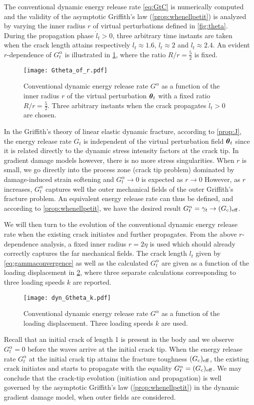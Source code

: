 The conventional dynamic energy release rate \eqref{eq:GtC} is numerically computed and the validity of the asymptotic Griffith's law (\cref{prop:whenellpetit}) is analyzed by varying the inner radius $r$ of virtual perturbations defined in \cref{fig:theta}. During the propagation phase $\dot{l}_t>0$, three arbitrary time instants are taken when the crack length attains respectively $l_t\approx 1.6$, $l_t\approx 2$ and $l_t\approx 2.4$. An evident $r$-dependence of $G^\alpha_t$ is illustrated in \cref{fig:indvelocity}, where the ratio $R/r=\frac{5}{2}$ is fixed.
\begin{figure}[htbp]
\centering
\texttt{[image: Gtheta\_of\_r.pdf]}
\caption{Conventional dynamic energy release rate $G^\alpha$ as a function of the inner radius $r$ of the virtual perturbation $\vtheta_t$ with a fixed ratio $R/r=\frac{5}{2}$. Three arbitrary instants when the crack propagates $\dot{l}_t>0$ are chosen.} \label{fig:indvelocity}
\end{figure}
In the Griffith's theory of linear elastic dynamic fracture, according to \cref{prop:J}, the energy release rate $G_t$ is independent of the virtual perturbation field $\vtheta_t$ since it is related directly to the dynamic stress intensity factors at the crack tip. In gradient damage models however, there is no more stress singularities. When $r$ is small, we go directly into the process zone (crack tip problem) dominated by damage-induced strain softening and $G^\alpha_t\to 0$ is expected as $r\to 0$ However, as $r$ increases, $G^\alpha_t$ captures well the outer mechanical fields of the outer Griffith's fracture problem. An equivalent energy release rate can thus be defined, and according to \cref{prop:whenellpetit}, we have the desired result $G^\alpha_t=\gamma_t\to (G_\mathrm{c})_\mathrm{eff}$.

We will then turn to the evolution of the conventional dynamic energy release rate when the existing crack initiates and further propagates. From the above $r$-dependence analysis, a fixed inner radius $r=2\eta$ is used which should already correctly captures the far mechanical fields. The crack length $l_t$ given by \eqref{eq:gammaconvergence} as well as the calculated $G^\alpha_t$ are given as a function of the loading displacement in \cref{fig:evoGtGc}, where three separate calculations corresponding to three loading speeds $k$ are reported.
\begin{figure}[htbp]
\centering
\texttt{[image: dyn\_Gtheta\_k.pdf]}
\caption{Conventional dynamic energy release rate $G^\alpha$ as a function of the loading displacement. Three loading speeds $k$ are used.} \label{fig:evoGtGc}
\end{figure}
Recall that an initial crack of length 1 is present in the body and we observe $G^\alpha_t=0$ before the waves arrive at the initial crack tip. When the energy release rate $G^\alpha_t$ at the initial crack tip attains the fracture toughness $(G_\mathrm{c})_\mathrm{eff}$, the existing crack initiates and starts to propagate with the equality $G^\alpha_t=(G_\mathrm{c})_\mathrm{eff}$. We may conclude that the crack-tip evolution (initiation and propagation) is well governed by the asymptotic Griffith's law (\cref{prop:whenellpetit}) in the dynamic gradient damage model, when outer fields are considered.


